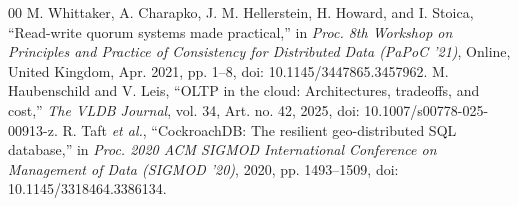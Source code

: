 \documentclass[conference]{IEEEtran}
\begin{document}
\begin{thebibliography}{00}
M. Whittaker, A. Charapko, J. M. Hellerstein,
H. Howard, and I. Stoica,
``Read-write quorum systems made practical,''
in \textit{Proc. 8th Workshop on Principles and Practice
of Consistency for Distributed Data (PaPoC '21)},
Online, United Kingdom, Apr. 2021, pp. 1--8,
doi: 10.1145/3447865.3457962.
 M. Haubenschild and V. Leis, ``OLTP in the cloud: Architectures, tradeoffs, and cost,'' \textit{The VLDB Journal}, vol. 34, Art. no. 42, 2025, doi: 10.1007/s00778-025-00913-z.
 R. Taft \textit{et al.}, ``CockroachDB: The resilient geo-distributed SQL database,'' in \textit{Proc. 2020 ACM SIGMOD International Conference on Management of Data (SIGMOD '20)}, 2020, pp. 1493--1509, doi: 10.1145/3318464.3386134.
\end{thebibliography}
\end{document}
